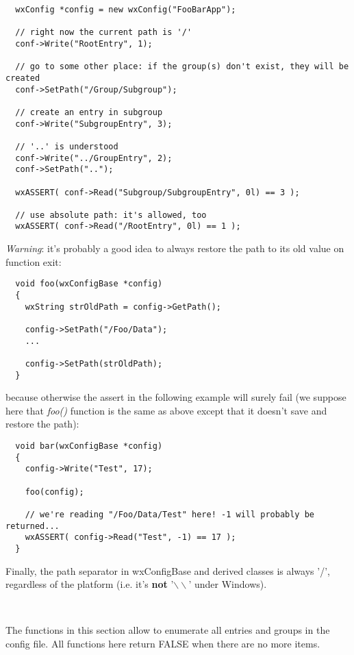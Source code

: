 \begin{verbatim}
  wxConfig *config = new wxConfig("FooBarApp");

  // right now the current path is '/'
  conf->Write("RootEntry", 1);

  // go to some other place: if the group(s) don't exist, they will be created
  conf->SetPath("/Group/Subgroup");

  // create an entry in subgroup
  conf->Write("SubgroupEntry", 3);
  
  // '..' is understood
  conf->Write("../GroupEntry", 2);
  conf->SetPath("..");

  wxASSERT( conf->Read("Subgroup/SubgroupEntry", 0l) == 3 );

  // use absolute path: it's allowed, too
  wxASSERT( conf->Read("/RootEntry", 0l) == 1 );
\end{verbatim}

{\it Warning}: it's probably a good idea to always restore the path to its
old value on function exit:

\begin{verbatim}
  void foo(wxConfigBase *config)
  {
    wxString strOldPath = config->GetPath();

    config->SetPath("/Foo/Data");
    ...

    config->SetPath(strOldPath);
  }
\end{verbatim}

because otherwise the assert in the following example will surely fail
(we suppose here that {\it foo()} function is the same as above except that it
doesn't save and restore the path):

\begin{verbatim}
  void bar(wxConfigBase *config)
  {
    config->Write("Test", 17);
    
    foo(config);

    // we're reading "/Foo/Data/Test" here! -1 will probably be returned...
    wxASSERT( config->Read("Test", -1) == 17 );
  }
\end{verbatim}

Finally, the path separator in wxConfigBase and derived classes is always '/',
regardless of the platform (i.e. it's {\bf not} '$\backslash\backslash$' under Windows).

\\


The functions in this section allow to enumerate all entries and groups in the
config file. All functions here return FALSE when there are no more items.

